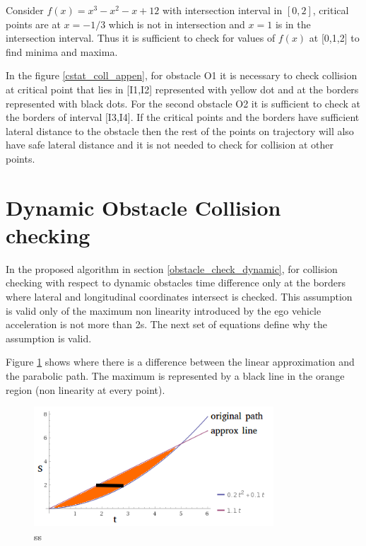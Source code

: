 Consider $f(x) = x^3 - x^2 -x + 12$ with intersection interval in $[0,2]$, critical points are at $x=-1/3$ which is not in intersection and $x=1$ is in the intersection interval. Thus it is sufficient to check for values of $f(x)$ at [0,1,2] to find minima and maxima. 

In the figure \ref{cstat_coll_appen}, for obstacle O1 it is necessary to check collision at critical point that lies in [I1,I2] represented with yellow dot and at the borders represented with black dots. For the second obstacle O2 it is sufficient to check at the borders of interval [I3,I4]. If the critical points and the borders have sufficient lateral distance to the obstacle then the rest of the points on trajectory will also have safe lateral distance and it is not needed to check for collision at other points. 


\section{Dynamic Obstacle Collision checking}
\label{dynamic_obst_appendix}

In the proposed algorithm in section \ref{obstacle_check_dynamic}, for collision checking with respect to dynamic obstacles time difference only at the borders where lateral and longitudinal coordinates intersect is checked. This assumption is valid only of the maximum non linearity introduced by the ego vehicle acceleration is not more than 2s. The next set of equations define why the assumption is valid. 

Figure \ref{dynamic_approx_appen} shows where there is a difference between the linear approximation and the parabolic path. The maximum is represented by a black line in the orange region (non linearity at every point). 

\begin{figure}
	\centering
	\includegraphics[width=0.8\textwidth]{Images/appendix/dynamic_approx.png}
	\caption{ss}
	\label{dynamic_approx_appen}
\end{figure}

